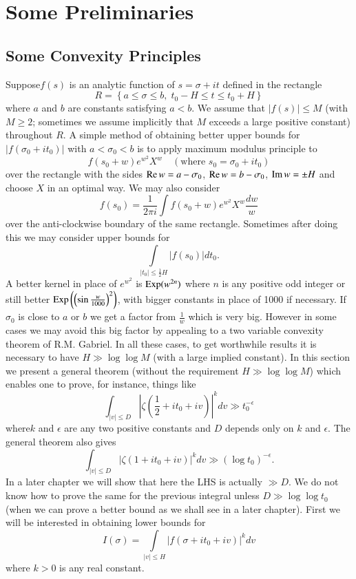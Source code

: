 
\chapter{Some Preliminaries}\label{c1}

\section{Some Convexity Principles}\label{c1:sec1.1}
Suppose\pageoriginale $f(s)$ is an analytic function of $s = \sigma + it$ defined in the rectangle
$$
R = \left\{a \leq \sigma \leq b, \; t_0 - H \leq t \leq t_0 + H \right\}
$$
where $a$ and $b$ are constants satisfying $a<b$. We assume that $|f(s)| \leq M$ (with $M \geq 2$; sometimes we assume implicitly that $M$ exceeds a large positive constant) throughout $R$. A simple method of obtaining better upper bounds for $|f(\sigma_0 + it_0)|$ with $a < \sigma_0 < b$ is to apply maximum modulus principle to 
$$
f(s_0 + w) e^{w^2} X^w \quad (\text{where } s_0 = \sigma_0 + it_0)
$$
over the rectangle with the sides $\operatorname{Re} w = a - \sigma_0$, $\operatorname{Re} w = b - \sigma_0$, $\operatorname{Im} w = \pm H$ and choose $X$ in an optimal way. We may also consider
$$
f(s_0) = \frac{1}{2\pi i} \int f(s_0+ w) e^{w^2} X^w  \frac{dw}{w}
$$
over the anti-clockwise boundary of the same rectangle. Sometimes after doing this we may consider upper bounds for 
$$
\int\limits_{|t_0| \leq \frac{1}{2} H} |f(s_0)| dt_0.
$$
A better kernel in place of $e^{w^2}$ is $\operatorname{Exp} (w^{2n})$ where $n$ is any positive odd integer or still better $\operatorname{Exp} \left(\left(\sin \frac{w}{1000} \right)^2 \right)$, with bigger constants in place of 1000 if necessary. If $\sigma_0$ is close to $a$ or $b$ we get a factor from $\frac{1}{w}$ which is very big. However in some cases we may avoid this big factor by appealing to a two variable convexity theorem of R.M. Gabriel. In all these cases, to get worthwhile results it is necessary to have $H \gg \log \log M$ (with a large implied constant). In this section we present a general theorem (without the requirement $H \gg \log \log M$) which enables one to prove, for instance, things like 
$$
\int_{|v| \leq D} | \zeta \left( \frac{1}{2} + it_0 + iv\right) |^k dv \gg t^{-\epsilon}_0
$$
where\pageoriginale $k$ and $\epsilon$ are any two positive constants and $D$ depends only on $k$ and $\epsilon$. The general theorem also gives
$$
\int_{|v| \leq D} |\zeta(1+it_0 +iv)|^k dv \gg (\log t_0)^{-\epsilon}.
$$
In a later chapter we will show that here the LHS is actually $\gg D$. We do not know how to prove the same for the previous integral unless $D \gg \log \log t_0$ (when we can prove a better bound as we shall see in a later chapter). First we will be interested in obtaining lower bounds for 
\begin{equation*}
I(\sigma)= \int\limits_{|v| \leq H} |f(\sigma + it_0 + iv)|^k dv \tag{1.1.1}\label{c1:eq1.1.1}
\end{equation*}
where $k>0$ is any real constant.

